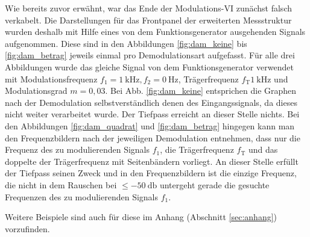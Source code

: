 		Wie bereits zuvor erwähnt, war das Ende der Modulations-VI zunächst falsch verkabelt.
		Die Darstellungen für das Frontpanel der erweiterten Messstruktur wurden deshalb mit Hilfe eines von dem Funktionsgenerator ausgehenden Signals aufgenommen.
		Diese sind in den Abbildungen \ref{fig:dam_keine} bis \ref{fig:dam_betrag} jeweils einmal pro Demodulationsart aufgefasst.
		Für alle drei Abbildungen wurde das gleiche Signal von dem Funktionsgenerator verwendet mit Modulationsfrequenz $f_1= \SI{1}{\kilo\hertz}, f_2 = \SI{0}{\hertz}$, Trägerfrequenz $f_\text{T}\SI{1}{\kilo\hertz}$ und Modulationsgrad $m = 0,03$.
		Bei Abb. \ref{fig:dam_keine} entsprichen die Graphen nach der Demodulation selbstverständlich denen des Eingangssignals, da dieses nicht weiter verarbeitet wurde.
		Der Tiefpass erreicht an dieser Stelle nichts.
		Bei den Abbildungen \ref{fig:dam_quadrat} und \ref{fig:dam_betrag} hingegen kann man den Frequenzbildern nach der jeweiligen Demodulation entnehmen, dass nur die Frequenz des zu modulierenden Signals $f_1$, die Trägerfrequenz $f_\text{T}$ und das doppelte der Trägerfrequenz mit Seitenbändern vorliegt.
		An dieser Stelle erfüllt der Tiefpass seinen Zweck und in den Frequenzbildern ist die einzige Frequenz, die nicht in dem Rauschen bei $\leq \SI{-50}{\decibel}$ untergeht gerade die gesuchte Frequenzen des zu modulierenden Signals $f_1$.
		
		Weitere Beispiele sind auch für diese im Anhang (Abschnitt \ref{sec:anhang}) vorzufinden.
		
